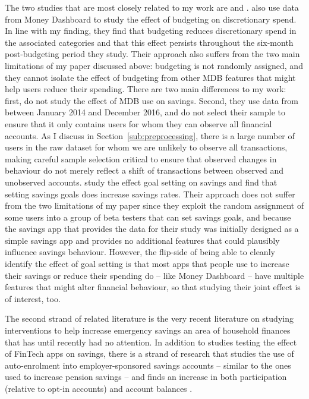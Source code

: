 The two studies that are most closely related to my work are
\citet{lukas2022influence} and \citet{gargano2021goal}.
\citet{lukas2022influence} also use data from Money Dashboard to study the
effect of budgeting on discretionary spend. In line with my finding, they find
that budgeting reduces discretionary spend in the associated categories and
that this effect persists throughout the six-month post-budgeting period they
study. Their approach also suffers from the two main limitations of my paper
discussed above: budgeting is not randomly assigned, and they cannot isolate
the effect of budgeting from other MDB features that might help users reduce
their spending. There are two main differences to my work: first,
\citet{lukas2022influence} do not study the effect of MDB use on savings.
Second, they use data from between January 2014 and December 2016, and do not
select their sample to ensure that it only contains users for whom they can
observe all financial accounts. As I discuss in
Section~\ref{sub:preprocessing}, there is a large number of users in the raw
dataset for whom we are unlikely to observe all transactions, making careful
sample selection critical to ensure that observed changes in behaviour do not
merely reflect a shift of transactions between observed and unobserved
accounts. \citet{gargano2021goal} study the effect goal setting on savings and
find that setting savings goals does increase savings rates. Their approach
does not suffer from the two limitations of my paper since they exploit the
random assignment of some users into a group of beta testers that can set
savings goals, and because the savings app that provides the data for their
study was initially designed as a simple savings app and provides no additional
features that could plausibly influence savings behaviour. However, the
flip-side of being able to cleanly identify the effect of goal setting is that
most apps that people use to increase their savings or reduce their spending do
-- like Money Dashboard -- have multiple features that might alter financial
behaviour, so that studying their joint effect is of interest, too.

The second strand of related literature is the very recent literature on studying
interventions to help increase emergency savings an area of household finances
that has until recently had no attention. In addition to studies testing the
effect of FinTech apps on savings, there is a strand of research that studies
the use of auto-enrolment into employer-sponsored savings accounts -- similar
to the ones used to increase pension savings \citep{thaler2004save,
choi2004better, choukhmane2019default} -- and finds an increase in both
participation (relative to opt-in accounts) and account balances
\citep{beshears2020building, berk2022automating}.

